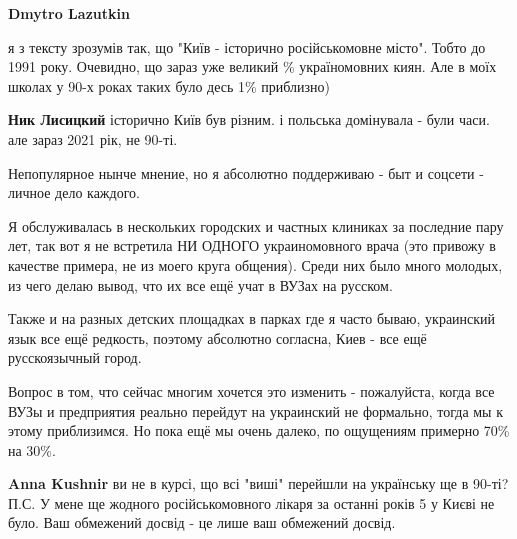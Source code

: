 \begin{itemize}
\begin{itemize}
\textbf{Dmytro Lazutkin} 

я з тексту зрозумів так, що "Київ - історично російськомовне місто". Тобто до
1991 року. Очевидно, що зараз уже великий \% україномовних киян. Але в моїх
школах у 90-х роках таких було десь 1\% приблизно)


 
\textbf{Ник Лисицкий} історично Київ був різним. і польська домінувала - були часи. але зараз 2021 рік, не 90-ті.

\end{itemize}


Непопулярное нынче мнение, но я абсолютно поддерживаю - быт и соцсети - личное
дело каждого. 

Я обслуживалась в нескольких городских и частных клиниках за последние пару
лет, так вот я не встретила НИ ОДНОГО украиномовного врача (это привожу в
качестве примера, не из моего круга общения). Среди них было много молодых, из
чего делаю вывод, что их все ещё учат в ВУЗах на русском. 

Также и на разных детских площадках в парках где я часто бываю, украинский язык
все ещё редкость, поэтому абсолютно согласна, Киев - все ещё русскоязычный
город.

Вопрос в том, что сейчас многим хочется это изменить - пожалуйста, когда все
ВУЗы и предприятия реально перейдут на украинский не формально, тогда мы к
этому приблизимся. Но пока ещё мы очень далеко, по ощущениям примерно 70\% на
30\%.

\begin{itemize}
 
\textbf{Anna Kushnir} ви не в курсі, що всі "виші" перейшли на українську ще в 90-ті? П.С. У мене ще жодного російськомовного лікаря за останні років 5 у Києві не було. Ваш обмежений досвід - це лише ваш обмежений досвід.

 

\end{itemize}
\end{itemize}
